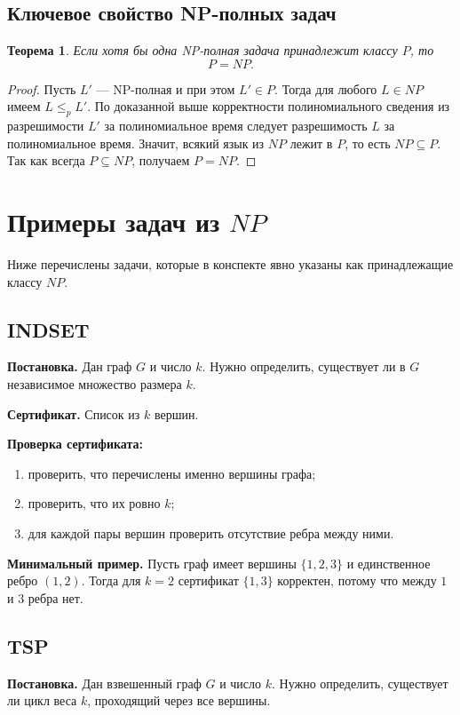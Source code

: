 \documentclass[12pt,a4paper]{article}
\theoremstyle{definition}
\theoremstyle{plain}
\newtheorem{theorem}{Теорема}[section]
\begin{document}
\subsection{Ключевое свойство NP-полных задач}
\begin{theorem}
Если хотя бы одна NP-полная задача принадлежит классу $P$, то
\[
P=NP.
\]
\end{theorem}

\begin{proof}
Пусть $L'$ --- NP-полная и при этом $L'\in P$. Тогда для любого $L\in NP$ имеем $L\le_p L'$. По доказанной выше корректности полиномиального сведения из разрешимости $L'$ за полиномиальное время следует разрешимость $L$ за полиномиальное время. Значит, всякий язык из $NP$ лежит в $P$, то есть $NP\subseteq P$. Так как всегда $P\subseteq NP$, получаем $P=NP$.
\end{proof}

\section{Примеры задач из \texorpdfstring{$NP$}{NP}}

Ниже перечислены задачи, которые в конспекте явно указаны как принадлежащие классу $NP$.

\subsection{\textsc{INDSET}}
\textbf{Постановка.} Дан граф $G$ и число $k$. Нужно определить, существует ли в $G$ независимое множество размера $k$.

\textbf{Сертификат.} Список из $k$ вершин.

\textbf{Проверка сертификата:}
\begin{enumerate}
\item проверить, что перечислены именно вершины графа;
\item проверить, что их ровно $k$;
\item для каждой пары вершин проверить отсутствие ребра между ними.
\end{enumerate}

\textbf{Минимальный пример.}
Пусть граф имеет вершины $\{1,2,3\}$ и единственное ребро $(1,2)$.
Тогда для $k=2$ сертификат $\{1,3\}$ корректен, потому что между $1$ и $3$ ребра нет.

\subsection{\textsc{TSP}}
\textbf{Постановка.} Дан взвешенный граф $G$ и число $k$. Нужно определить, существует ли цикл веса $k$, проходящий через все вершины.
\end{document}
